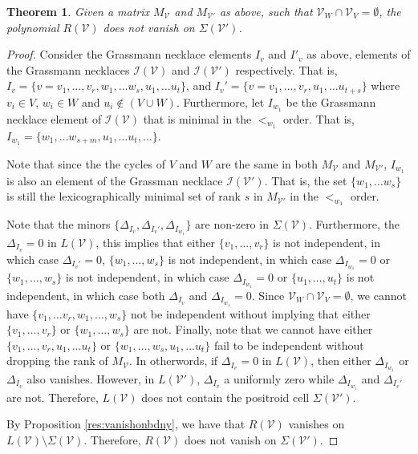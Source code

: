 \documentclass[11pt]{article}
\newcommand{\cV}{\mathcal{V}}
\newcommand{\cI}{\mathcal{I}}
\newtheorem{thm}{Theorem}[section]
\theoremstyle{remark}
\theoremstyle{definition}
\begin{document}
\begin{thm}
Given a matrix $M_{\cV}$ and $M_{\cV'}$ as above, such that $\cV_W \cap \cV_V = \emptyset$, the polynomial $R(\cV)$ does not vanish on $\Sigma(\cV')$. 
\end{thm} 

\begin{proof}
Consider the Grassmann necklace elements $I_v$ and $I'_v$ as above, elements of the Grassmann necklaces $\cI(\cV)$ and $\cI(\cV')$ respectively. That is, $I_v =  \{v = v_1, \ldots, v_r, w_1, \ldots w_s, u_1, \ldots u_t\}$, and $I_v' =  \{v = v_1, \ldots, v_r, u_1, \ldots u_{t+s}\}$ where $v_i \in V$, $w_i \in W$ and $u_i \not \in (V \cup W)$. Furthermore, let $I_{w_1}$ be the Grassmann necklace element of $\cI(\cV)$ that is minimal in the $<_{w_1}$ order. That is, $I_{w_1} =  \{ w_1, \ldots w_{s+m}, u_1, \ldots u_t, \ldots \}$. 

Note that since the the cycles of $V$ and $W$ are the same in both $M_{\cV}$ and $M_{\cV'}$, $I_{w_1}$ is also an element of the Grassman necklace $\cI(\cV')$. That is, the set $\{ w_1, \ldots w_s\}$ is still the lexicographically minimal set of rank $s$ in $M_{\cV'}$ in the $<_{w_1}$ order. 

Note that the minors $\{\Delta_{I_v}, \Delta_{I_v'}, \Delta_{I_{w_1}}\}$ are non-zero in $\Sigma(\cV)$. Furthermore, the $\Delta_{I_v} = 0$ in $L(\cV)$, this implies that either $\{v_1, \ldots, v_r\}$ is not independent, in which case $\Delta_{I_v'} = 0$, $\{w_1, \ldots, w_s\}$ is not independent, in which case $\Delta_{I_{w_1}} = 0$ or $\{w_1, \ldots, w_s\}$ is not independent, in which case $\Delta_{I_{w_1}} = 0$ or $\{u_1, \ldots, u_t\}$ is not independent, in which case both $\Delta_{I_v}$ and $\Delta_{I_{w_1}} = 0$. Since $\cV_W \cap \cV_V = \emptyset$, we cannot have $\{v_1, \ldots v_r, w_1, \ldots, w_s\}$ not be independent without implying that either $\{v_1, \ldots, v_r\}$ or $\{w_1, \ldots, w_s\}$ are not. Finally, note that we cannot have either $\{v_1, \ldots, v_r, u_1, \ldots u_t\}$ or $\{w_1, \ldots, w_s, u_1, \ldots u_t\}$ fail to be independent without dropping the rank of $M_{\cV}$. In otherwords, if $\Delta_{I_v} = 0$ in $L(\cV)$, then either $\Delta_{I_{w_1}}$ or $\Delta_{I_v}$ also vanishes. However, in $L(\cV')$, $\Delta_{I_v}$ a uniformly zero while $\Delta_{I_{w_1}}$ and $\Delta_{I_v'}$ are not. Therefore, $L(\cV)$ does not contain the positroid cell $\Sigma(\cV')$.

By Proposition \ref{res:vanishonbdny}, we have that $R(\cV)$ vanishes on $L(\cV) \setminus \Sigma(\cV)$. Therefore, $R(\cV)$ does not vanish on $\Sigma(\cV')$. 
\end{proof}
\end{document}
